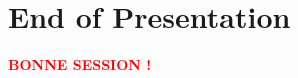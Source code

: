 \documentclass[xcolor=table]{beamer}
\begin{document}





\section{End of Presentation}
\begin{frame}
\begin{center}

 \textcolor{red}{\textbf{BONNE SESSION !}} 

\end{center}
\end{frame}
\end{document}
